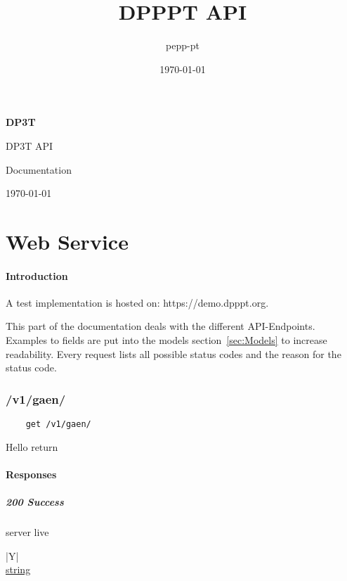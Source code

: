 \documentclass[a4paper
]{ubarticle}
\title{DPPPT API}
\date{\today}
\author{pepp-pt}
\begin{document}
\begin{titlepage}
	\hspace{4.3cm}
 {\raggedleft
	 \textbf{DP3T} \\
\vspace{0.3cm}
	 
\par}
	\vspace{3cm}
	{\Huge DP3T API \par}
	\vspace{1.5cm}
	{\huge Documentation \par}
	\vspace{3cm}
	{ \large \today }
	\end{titlepage}
\thispagestyle{empty}
\clearpage
\tableofcontents
\clearpage

\part{Web Service}
\subsection{Introduction}
A test implementation is hosted on: https://demo.dpppt.org. 

This part of the documentation deals with the different API-Endpoints. Examples to fields are put into the models section~\ref{sec:Models} to increase readability. Every request lists all possible status codes and the reason for the status code.
\section{ /v1/gaen/ }
    \begin{verbatim}
    get /v1/gaen/
    \end{verbatim}
Hello return

\subsection{Responses}
\subsubsection{ 200 Success }
server live
 

    
        \begin{ubresponses}{\textwidth}{|Y|}
        \\
        \hline
             \hyperref[sec:string] { string } \\
 \hline

        \end{ubresponses}
    
\end{document}
